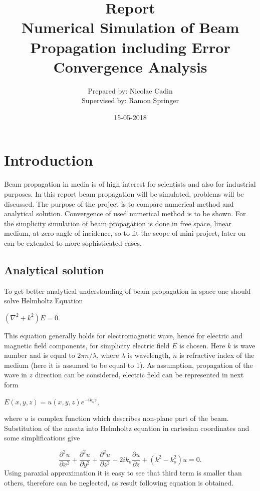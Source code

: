 \documentclass[a4paper]{article}
\title{Report\\Numerical Simulation of Beam Propagation including Error Convergence Analysis}
\date{15-05-2018}
\author{Prepared by: Nicolae Cadin \\Supervised by: Ramon Springer}
\begin{document}
		
	\maketitle
	\newpage
	\tableofcontents	

	
	\newpage
	\section{Introduction}
	Beam propagation in media is of high interest for scientists and also for industrial purposes. 
	In this report beam propagation will be simulated, problems will be discussed. The purpose of the project is to compare numerical method and analytical solution. Convergence of used numerical method is to be shown. For the simplicity simulation of beam propagation is done in free space, linear medium, at zero angle of incidence, so to fit the scope of mini-project, later on can be extended to more sophisticated cases.
	\subsection{Analytical solution}
	To get better analytical understanding of beam propagation in space one should solve Helmholtz Equation
	\begin{center}
		$(\nabla^2+k^2)E = 0$.
	\end{center}
	This equation generally holds for electromagnetic wave, hence for electric and magnetic field components, for simplicity electric field $E$ is chosen. Here $k$ is wave number and is equal to $2\pi n/\lambda$, where $\lambda$ is wavelength, $n$ is refractive index of the medium (here it is assumed to be equal to 1). As assumption, propagation of the wave in $z$ direction can be considered, electric field can be represented in next form
	\begin{center}
		$E(x,y,z)=u(x,y,z)e^{-ik_oz}$,
	\end{center}
	where  $u$ is complex function which describes non-plane part of the beam. Substitution of the ansatz into Helmholtz equation in cartesian coordinates and some simplifications give

	\[\frac{\partial^2 u}{\partial x^2}+ \frac{\partial^2 u}{\partial y^2}+ \frac{\partial^2 u}{\partial z^2} - 2ik_o\frac{\partial u}{\partial z}+(k^2-k_o^2)u=0.\]
	Using paraxial approximation it is easy to see that third term is smaller than others, therefore can be neglected, as result following equation is obtained.
	
\end{document}
